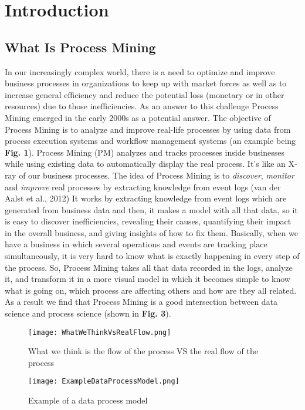 \documentclass[conference]{IEEEtran}
\begin{document}
\section{Introduction}

\subsection{What Is Process Mining}
In our increasingly complex world, there is a need to optimize and improve business processes in organizations to keep up with market forces as well as to increase general efficiency and reduce the potential loss (monetary or in other resources) due to those inefficiencies. As an answer to this challenge Process Mining emerged in the early 2000s as a potential answer. The objective of Process Mining is to analyze and improve real-life processes by using data from process execution systems and workflow management systems (an example being \textbf{Fig. 1}).
Process Mining (PM) analyzes and tracks processes inside businesses while using existing data to automatically display the real process. It’s like an X-ray of our business processes.
The idea of Process Mining is to \textit{discover}, \textit{monitor} and \textit{improve} real processes by extracting knowledge from event logs (van der Aalst et al., 2012)
It works by extracting knowledge from event logs which are generated from business data and then, it makes a model with all that data, so it is easy to discover inefficiencies, revealing their causes, quantifying their impact in the overall business, and giving insights of how to fix them.
Basically, when we have a business in which several operations and events are tracking place simultaneously, it is very hard to know what is exactly happening in every step of the process. So, Process Mining takes all that data recorded in the logs, analyze it, and transform it in a more visual model in which it becomes simple to know what is going on, which process are affecting others and how are they all related. As a result we find that Process Mining is a good intersection between data science and process science (shown in \textbf{Fig. 3}).

\begin{figure}[htp]
    \centering
    \texttt{[image: WhatWeThinkVsRealFlow.png]}
    \caption{What we think is the flow of the process VS the real flow of the process}
    \label{fig:modelDrawn}
\end{figure}

\begin{figure}[htp]
    \centering
    \texttt{[image: ExampleDataProcessModel.png]}
    \caption{Example of a data process model}
    \label{fig:modelDrawn}
\end{figure}
\end{document}
